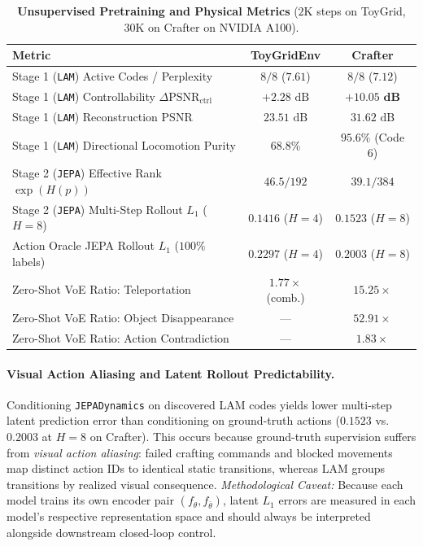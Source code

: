 \documentclass[11pt,letterpaper]{article}
\begin{document}
\begin{table}[ht]
\centering
\caption{\textbf{Unsupervised Pretraining and Physical Metrics} ($2\text{K}$ steps on ToyGrid, $30\text{K}$ on Crafter on NVIDIA A100).}
\label{tab:pretrain}
\vspace{0.4em}
\small
\setlength{\tabcolsep}{14pt}
\begin{tabular}{lcc}
\toprule
\textbf{Metric} & \textbf{ToyGridEnv} & \textbf{Crafter} \\
\midrule
Stage 1 (\texttt{LAM}) Active Codes / Perplexity & $8 / 8$ ($7.61$) & $8 / 8$ ($7.12$) \\
Stage 1 (\texttt{LAM}) Controllability $\Delta\text{PSNR}_{\text{ctrl}}$ & $+2.28\text{ dB}$ & $\mathbf{+10.05\text{ dB}}$ \\
Stage 1 (\texttt{LAM}) Reconstruction PSNR & $23.51\text{ dB}$ & $31.62\text{ dB}$ \\
Stage 1 (\texttt{LAM}) Directional Locomotion Purity & $68.8\%$ & $\mathbf{95.6\%}$ (Code 6) \\
Stage 2 (\texttt{JEPA}) Effective Rank $\exp(H(p))$ & $46.5 / 192$ & $39.1 / 384$ \\
Stage 2 (\texttt{JEPA}) Multi-Step Rollout $L_1$ ($H=8$) & $0.1416$ ($H=4$) & $\mathbf{0.1523}$ ($H=8$) \\
Action Oracle JEPA Rollout $L_1$ ($100\%$ labels) & $0.2297$ ($H=4$) & $0.2003$ ($H=8$) \\
\midrule
Zero-Shot VoE Ratio: Teleportation & $1.77\times$ (comb.) & $\mathbf{15.25\times}$ \\
Zero-Shot VoE Ratio: Object Disappearance & --- & $\mathbf{52.91\times}$ \\
Zero-Shot VoE Ratio: Action Contradiction & --- & $1.83\times$ \\
\bottomrule
\end{tabular}
\end{table}

\paragraph{Visual Action Aliasing and Latent Rollout Predictability.}
Conditioning \texttt{JEPADynamics} on discovered LAM codes yields lower multi-step latent prediction error than conditioning on ground-truth actions ($0.1523$ vs.\ $0.2003$ at $H=8$ on Crafter). This occurs because ground-truth supervision suffers from \emph{visual action aliasing}: failed crafting commands and blocked movements map distinct action IDs to identical static transitions, whereas LAM groups transitions by realized visual consequence.
\emph{Methodological Caveat:} Because each model trains its own encoder pair $(f_\theta, f_{\bar{\theta}})$, latent $L_1$ errors are measured in each model's respective representation space and should always be interpreted alongside downstream closed-loop control.
\end{document}
